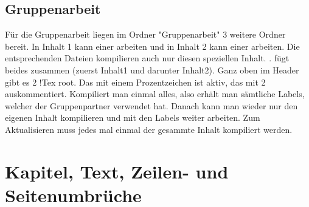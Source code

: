 	\subsection{Gruppenarbeit}
	Für die Gruppenarbeit liegen im Ordner "Gruppenarbeit" 3 weitere Ordner bereit. In Inhalt 1 kann einer arbeiten und in Inhalt 2 kann einer arbeiten. Die entsprechenden Dateien kompilieren auch nur diesen speziellen Inhalt. . fügt beides zusammen (zuerst Inhalt1 und darunter Inhalt2).\newline
	Ganz oben im Header gibt es 2 !Tex root. Das mit einem Prozentzeichen ist aktiv, das mit 2 auskommentiert. Kompiliert man einmal alles, also  erhält man sämtliche Labels, welcher der Gruppenpartner verwendet hat. Danach kann man wieder nur den eigenen Inhalt kompilieren und mit den Labels weiter arbeiten. Zum Aktualisieren muss jedes mal einmal der gesammte Inhalt kompiliert werden.
	
	
	\newpage
	\section{Kapitel, Text, Zeilen- und Seitenumbrüche}

